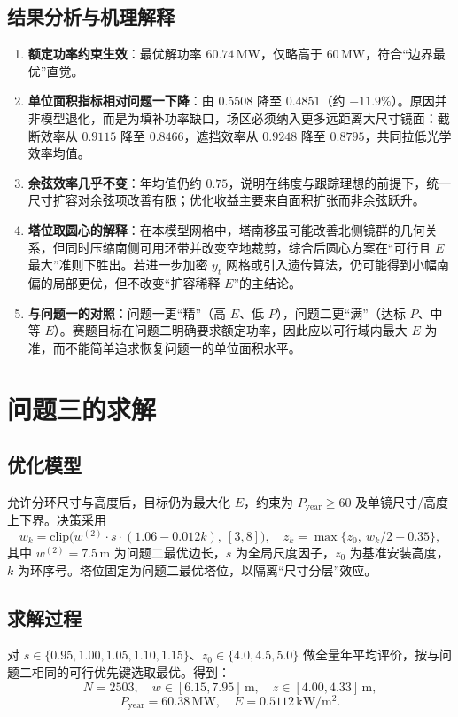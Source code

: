\documentclass[withoutpreface,bwprint]{cumcmthesis}
\begin{document}
\subsection{结果分析与机理解释}
\begin{enumerate}[leftmargin=2em]
  \item \textbf{额定功率约束生效}：最优解功率 $60.74\,\mathrm{MW}$，仅略高于 $60\,\mathrm{MW}$，符合“边界最优”直觉。
  \item \textbf{单位面积指标相对问题一下降}：由 $0.5508$ 降至 $0.4851$（约 $-11.9\%$）。原因并非模型退化，而是为填补功率缺口，场区必须纳入更多远距离大尺寸镜面：截断效率从 $0.9115$ 降至 $0.8466$，遮挡效率从 $0.9248$ 降至 $0.8795$，共同拉低光学效率均值。
  \item \textbf{余弦效率几乎不变}：年均值仍约 $0.75$，说明在纬度与跟踪理想的前提下，统一尺寸扩容对余弦项改善有限；优化收益主要来自面积扩张而非余弦跃升。
  \item \textbf{塔位取圆心的解释}：在本模型网格中，塔南移虽可能改善北侧镜群的几何关系，但同时压缩南侧可用环带并改变空地裁剪，综合后圆心方案在“可行且 $E$ 最大”准则下胜出。若进一步加密 $y_t$ 网格或引入遗传算法，仍可能得到小幅南偏的局部更优，但不改变“扩容稀释 $E$”的主结论。
  \item \textbf{与问题一的对照}：问题一更“精”（高 $E$、低 $P$），问题二更“满”（达标 $P$、中等 $E$）。赛题目标在问题二明确要求额定功率，因此应以可行域内最大 $E$ 为准，而不能简单追求恢复问题一的单位面积水平。
\end{enumerate}

\section{问题三的求解}

\subsection{优化模型}
允许分环尺寸与高度后，目标仍为最大化 $E$，约束为 $P_{\mathrm{year}}\ge60$ 及单镜尺寸/高度上下界。决策采用
\begin{equation}
w_k=\mathrm{clip}\bigl(w^{(2)}\cdot s\cdot(1.06-0.012k),\ [3,8]\bigr),\quad
z_k=\max\{z_0,\ w_k/2+0.35\},
\end{equation}
其中 $w^{(2)}=7.5\,\mathrm{m}$ 为问题二最优边长，$s$ 为全局尺度因子，$z_0$ 为基准安装高度，$k$ 为环序号。塔位固定为问题二最优塔位，以隔离“尺寸分层”效应。

\subsection{求解过程}
对 $s\in\{0.95,1.00,1.05,1.10,1.15\}$、$z_0\in\{4.0,4.5,5.0\}$ 做全量年平均评价，按与问题二相同的可行优先键选取最优。得到：
\[
N=2503,\quad w\in[6.15,7.95]\,\mathrm{m},\quad z\in[4.00,4.33]\,\mathrm{m},
\]
\[
P_{\mathrm{year}}=60.38\,\mathrm{MW},\quad E=0.5112\,\mathrm{kW/m^2}.
\]
\end{document}
